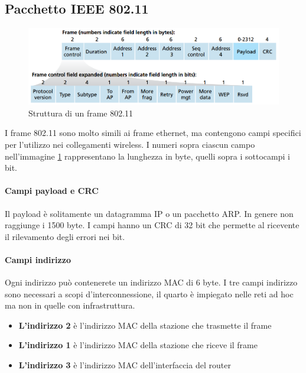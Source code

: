 \documentclass[11pt,a4paper]{book}
\begin{document}
\subsection{Pacchetto IEEE 802.11}
\begin{figure}
	\begin{center}
		\includegraphics[scale=0.3]{img/101.png}
		\caption{Struttura di un frame 802.11}
		\label{fig: 101}
	\end{center}
\end{figure}
I frame 802.11 sono molto simili ai frame ethernet, ma contengono campi specifici per l'utilizzo nei collegamenti wireless. I numeri sopra ciascun campo nell'immagine \ref{fig: 101} rappresentano la lunghezza in byte, quelli sopra i sottocampi i bit.
\paragraph{Campi payload e CRC}
Il payload è solitamente un datagramma IP o un pacchetto ARP. In genere non raggiunge i 1500 byte. I campi hanno un CRC di 32 bit che permette al ricevente il rilevamento degli errori nei bit.

\paragraph{Campi indirizzo}
Ogni indirizzo può contenerete un indirizzo MAC di 6 byte. I tre campi indirizzo sono necessari a scopi d'interconnessione, il quarto è impiegato nelle reti ad hoc ma non in quelle con infrastruttura.
\begin{itemize}
	\item \textbf{L'indirizzo 2} è l'indirizzo MAC della stazione che trasmette il frame
	\item \textbf{L'indirizzo 1} è l'indirizzo MAC della stazione che riceve il frame
	\item \textbf{L'indirizzo 3} è l'indirizzo MAC dell'interfaccia del router
\end{itemize}
\end{document}
